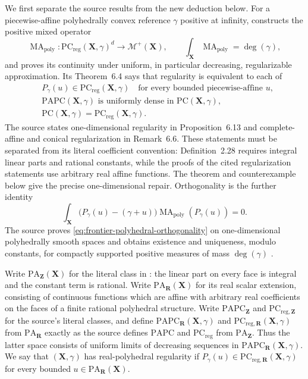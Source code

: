 \documentclass[11pt,a4paper]{article}
\theoremstyle{definition}
\theoremstyle{remark}
\DeclareMathOperator{\MA}{MA}
\begin{document}
We first separate the source results from the new deduction below.  For a
piecewise-affine polyhedrally convex reference \(\gamma\) positive at
infinity, \cite[Theorem~4.13 and Proposition~4.16]{BMPS26} constructs the
positive mixed operator
\[
 \MA_{\mathrm{poly}}:
 \mathrm{PC}_{\mathrm{reg}}(\mathbf X,\gamma)^d
 \longrightarrow\mathcal M^+(\mathbf X),
 \qquad
 \int_{\mathbf X}\MA_{\mathrm{poly}}=\deg(\gamma),
\]
and proves its continuity under uniform, in particular decreasing,
regularizable approximation.  Its Theorem~6.4 says that regularity is
equivalent to each of
\[
 \begin{split}
 &P_\gamma(u)\in\mathrm{PC}_{\mathrm{reg}}(\mathbf X,\gamma)
       \quad\text{for every bounded piecewise-affine }u,\\
 &\mathrm{PAPC}(\mathbf X,\gamma)
       \text{ is uniformly dense in }\mathrm{PC}(\mathbf X,\gamma),\\
 &\mathrm{PC}(\mathbf X,\gamma)
       =\mathrm{PC}_{\mathrm{reg}}(\mathbf X,\gamma).
 \end{split}
\]
The source states one-dimensional regularity in Proposition~6.13 and
complete-affine and conical regularization in Remark~6.6.  These statements
must be separated from its literal coefficient convention: Definition~2.28
requires integral linear parts and rational constants, while the proofs of
the cited regularization statements use arbitrary real affine functions.
The theorem and counterexample below give the precise one-dimensional
repair.  Orthogonality is the further
identity
\begin{equation}
 \int_{\mathbf X}
 \bigl(P_\gamma(u)-(\gamma+u)\bigr)
 \MA_{\mathrm{poly}}(P_\gamma(u))=0.
 \label{eq:frontier-polyhedral-orthogonality}
\end{equation}
The source proves \eqref{eq:frontier-polyhedral-orthogonality} on
one-dimensional polyhedrally smooth spaces and obtains existence and
uniqueness, modulo constants, for compactly supported positive measures of
mass \(\deg(\gamma)\)
\cite[Proposition~6.21 and Theorem~6.22]{BMPS26}.



Write $\mathrm{PA}_{\mathbf Z}(\mathbf X)$ for the literal class in
\cite[Definition~2.28]{BMPS26}: the linear part on every face is integral and
the constant term is rational.  Write
$\mathrm{PA}_{\mathbf R}(\mathbf X)$ for its real scalar extension, consisting
of continuous functions which are affine with arbitrary real coefficients on
the faces of a finite rational polyhedral structure.  Write
$\mathrm{PAPC}_{\mathbf Z}$ and
$\mathrm{PC}_{\mathrm{reg},\mathbf Z}$ for the source's literal classes, and
define
$\mathrm{PAPC}_{\mathbf R}(\mathbf X,\gamma)$ and
$\mathrm{PC}_{\mathrm{reg},\mathbf R}(\mathbf X,\gamma)$ from
$\mathrm{PA}_{\mathbf R}$ exactly as the source defines $\mathrm{PAPC}$ and
$\mathrm{PC}_{\mathrm{reg}}$ from $\mathrm{PA}_{\mathbf Z}$.  Thus the latter
space consists of uniform limits of decreasing sequences in
$\mathrm{PAPC}_{\mathbf R}(\mathbf X,\gamma)$.  We say that
$(\mathbf X,\gamma)$ has real-polyhedral regularity if
$P_\gamma(u)\in\mathrm{PC}_{\mathrm{reg},\mathbf R}(\mathbf X,\gamma)$ for
every bounded $u\in\mathrm{PA}_{\mathbf R}(\mathbf X)$.
\end{document}
